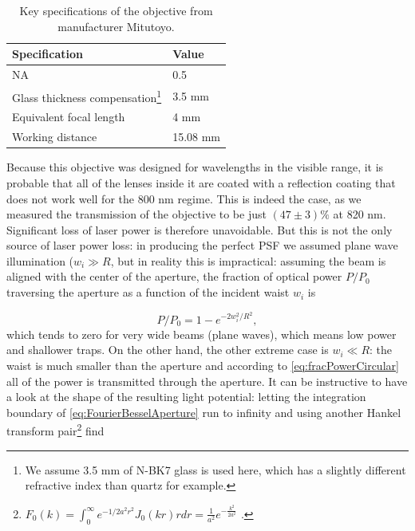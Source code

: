 \begin{table}[h]
    \centering
    \caption{Key specifications of the objective from manufacturer Mitutoyo.}
    \label{table:MitutoyoSpecs}
    \begin{tabular}{l | l}
        \textbf{Specification}       & \textbf{Value} \\ \hline 
        NA                           & 0.5            \\ \hline
        Glass thickness compensation\footnote{We assume 3.5 mm of N-BK7 glass is used here, which has a slightly different refractive index than quartz for example.} & 3.5 mm         \\ \hline
        Equivalent focal length      & 4 mm           \\ \hline
        Working distance             & 15.08 mm      
    \end{tabular}
\end{table}
\noindent Because this objective was designed for wavelengths in the visible range, it is probable that all of the lenses inside it are coated with a reflection coating that does not work well for the 800 nm regime. 
This is indeed the case, as we measured the transmission of the objective to be just $(47 \pm 3)\%$ at 820 nm. 
Significant loss of laser power is therefore unavoidable.
But this is not the only source of laser power loss: in producing the perfect \ac{PSF} we assumed plane wave illumination ($w_i \gg R$, but in reality this is impractical: assuming the beam is aligned with the center of the aperture, the fraction of optical power $P/P_0$ traversing the aperture as a function of the incident waist $w_i$ is

\begin{equation}\label{eq:fracPowerCircular}
    P/P_0 = 1 - e^{-2w_i^2/R^2},
\end{equation}
which tends to zero for very wide beams (plane waves), which means low power and shallower traps.
On the other hand, the other extreme case is $w_i \ll R$: the waist is much smaller than the aperture and according to \cref{eq:fracPowerCircular} all of the power is transmitted through the aperture.
It can be instructive to have a look at the shape of the resulting light potential: letting the integration boundary of \cref{eq:FourierBesselAperture} run to infinity and using another Hankel transform pair\footnote{$F_0(k) = \int_0^{\infty} e^{-1/2 a^2 r^2} J_0(k r)r dr = \frac{1}{a^2} e^{-\frac{k^2}{2a^2}}$ \cite{Papoulis2981}.} find 

